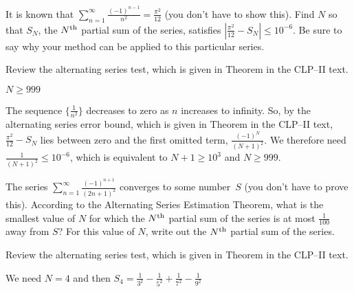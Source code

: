 \begin{Mquestion}[2016Q5]
It is known that $\displaystyle \sum_{n=1}^\infty \frac{(-1)^{n-1}}{n^2} = \frac{\pi^2}{12}$
(you don't have to show this).
Find $N$ so that $S_N$, the $N^{\rm th}$ partial sum of the series, satisfies
$| \frac{\pi^2}{12} - S_N | \le 10^{-6}$. Be sure to say why your method can be
applied to this particular series.
\end{Mquestion}

\begin{hint}
Review the alternating series test, which is given in
Theorem  in the
CLP--II text.
\end{hint}

\begin{answer}
$N\geq 999$
\end{answer}

\begin{solution}
The sequence $\{\frac{1}{n^2}\}$ decreases to zero as $n$ increases to infinity.
So, by the alternating series error bound, which is given in
Theorem  in the
CLP--II text, $\frac{\pi^2}{12}-S_N$ lies between zero and
the first omitted term, $ \frac{(-1)^{N}}{(N+1)^2}$.
We therefore need $\frac{1}{(N+1)^2} \leq 10^{-6}$,
which is equivalent to $N+1 \geq 10^3$ and $N\geq 999$.
\end{solution}




\begin{question}[2015A]
The series $\displaystyle \sum_{n=1}^\infty \frac{(-1)^{n+1}}{(2n+1)^2}$ converges to some number~$S$ (you don't have to prove this). According to the Alternating Series Estimation Theorem, what is the smallest value of $N$ for which the $N^{\rm th}$
partial sum of the series is at most $\frac1{100}$ away from $S$? For this value of $N$,
write out the $N^{\rm th}$ partial sum of the series.
\end{question}

\begin{hint}
Review the alternating series test, which is given in
Theorem  in the
CLP--II text.
\end{hint}

\begin{answer}
We need  $N=4$ and then
$
   S_4= \frac{1}{3^2}-\frac{1}{5^2} +\frac{1}{7^2} -\frac{1}{9^2}
$
\end{answer}

